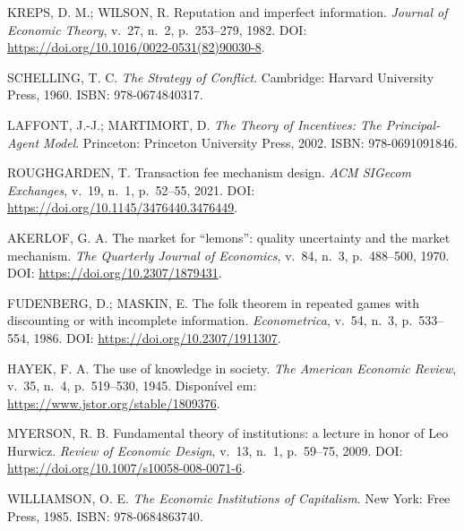 \begin{enumerate}[{[1]}]
    \item \label{ref:kreps1982} KREPS, D. M.; WILSON, R. Reputation and imperfect information. \textit{Journal of Economic Theory}, v.~27, n.~2, p.~253--279, 1982. DOI: \url{https://doi.org/10.1016/0022-0531(82)90030-8}.
    
    \item \label{ref:schelling1960} SCHELLING, T. C. \textit{The Strategy of Conflict}. Cambridge: Harvard University Press, 1960. ISBN: 978-0674840317.
    
    \item \label{ref:laffont2002} LAFFONT, J.-J.; MARTIMORT, D. \textit{The Theory of Incentives: The Principal-Agent Model}. Princeton: Princeton University Press, 2002. ISBN: 978-0691091846.
    
    \item \label{ref:roughgarden2021} ROUGHGARDEN, T. Transaction fee mechanism design. \textit{ACM SIGecom Exchanges}, v.~19, n.~1, p.~52--55, 2021. DOI: \url{https://doi.org/10.1145/3476440.3476449}.
    
    \item \label{ref:akerlof1970} AKERLOF, G. A. The market for ``lemons'': quality uncertainty and the market mechanism. \textit{The Quarterly Journal of Economics}, v.~84, n.~3, p.~488--500, 1970. DOI: \url{https://doi.org/10.2307/1879431}.
    
    \item \label{ref:fudenberg1986} FUDENBERG, D.; MASKIN, E. The folk theorem in repeated games with discounting or with incomplete information. \textit{Econometrica}, v.~54, n.~3, p.~533--554, 1986. DOI: \url{https://doi.org/10.2307/1911307}.
    
    \item \label{ref:hayek1945} HAYEK, F. A. The use of knowledge in society. \textit{The American Economic Review}, v.~35, n.~4, p.~519--530, 1945. Disponível em: \url{https://www.jstor.org/stable/1809376}.
    
    \item \label{ref:myerson2009} MYERSON, R. B. Fundamental theory of institutions: a lecture in honor of Leo Hurwicz. \textit{Review of Economic Design}, v.~13, n.~1, p.~59--75, 2009. DOI: \url{https://doi.org/10.1007/s10058-008-0071-6}.
    
    \item \label{ref:williamson1985} WILLIAMSON, O. E. \textit{The Economic Institutions of Capitalism}. New York: Free Press, 1985. ISBN: 978-0684863740.
    

\end{enumerate}
